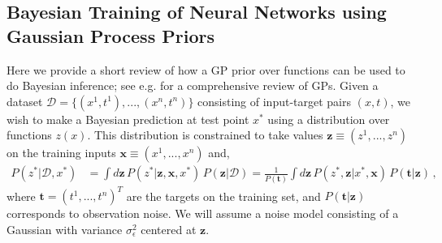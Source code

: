 \documentclass{article} %
\newcommand{\mb}{\mathbf}
\begin{document}
\subsection{Bayesian Training of Neural Networks using Gaussian Process Priors}
\label{sec:Integration}

Here we provide a short review of how a GP prior over functions can be used to do Bayesian inference; see e.g. \citep{rasmussen2006gaussian} for a comprehensive review of GPs. Given a dataset $\mathcal{D} = \{ (x^{1}, t^{1}), ..., (x^{n}, t^{n}) \}$ consisting of input-target pairs $(x, t)$, we wish to make a Bayesian prediction at test point $x^{*}$ using
a distribution over functions $z(x)$. This distribution is constrained to take values $\bm{z} \equiv (z^{1}, ..., z^{n})$ on the training inputs $\bm{x} \equiv (x^{1}, ..., x^{n})$ and,
\begin{align}
P(z^{*} | \mathcal{D}, x^{*}) &= \int d\bm{z} \, P(z^{*} | \bm{z}, \bm{x}, x^{*}) \, P(\bm{z} | \mathcal{D}) 
= \frac{1}{P(\mb t)} \int d\bm{z} \, P(z^{*}, \bm{z} | x^{*}, \bm{x}) \, P(\mb t | \bm{z})\,
,
\label{eq:eq1}
\end{align}
where $\bm{t} = (t^{1}, ..., t^{n})^{T}$ are the targets on the training set, and $P(\mb t | \bm{z})$ corresponds to observation noise. We will assume a noise model consisting of a Gaussian with variance $\sigma^2_{\epsilon}$ centered at $\bm{z}$. 
\end{document}
